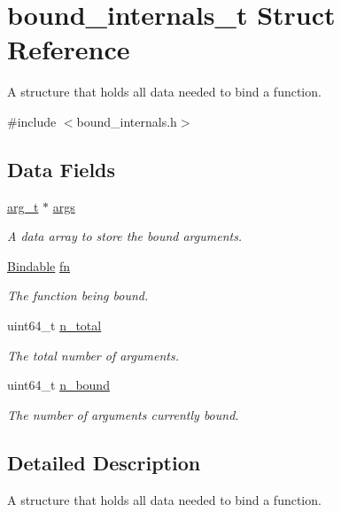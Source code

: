 \hypertarget{structbound__internals__t}{}\section{bound\+\_\+internals\+\_\+t Struct Reference}
\label{structbound__internals__t}


A structure that holds all data needed to bind a function.  




{\ttfamily \#include $<$bound\+\_\+internals.\+h$>$}

\subsection*{Data Fields}
\begin{DoxyCompactItemize}
\item 
\hyperlink{bind__defs_8h_aa409ee08129c587e002cf2062a09a744}{arg\+\_\+t} $\ast$ \hyperlink{structbound__internals__t_a84757175e6e08d7364e8aad728e49985}{args}
\begin{DoxyCompactList}\small\item\em A data array to store the bound arguments. \end{DoxyCompactList}\item 
\hyperlink{bind__defs_8h_a8fdbf6bcbe597219692d8bd8952b9839}{Bindable} \hyperlink{structbound__internals__t_ac9b29b4f9b69674cef9fb3d083b92521}{fn}
\begin{DoxyCompactList}\small\item\em The function being bound. \end{DoxyCompactList}\item 
uint64\+\_\+t \hyperlink{structbound__internals__t_a804e2e3c6b4c0ca1814c6884ed0bd161}{n\+\_\+total}
\begin{DoxyCompactList}\small\item\em The total number of arguments. \end{DoxyCompactList}\item 
uint64\+\_\+t \hyperlink{structbound__internals__t_aa959691320a507b149ff25164740a323}{n\+\_\+bound}
\begin{DoxyCompactList}\small\item\em The number of arguments currently bound. \end{DoxyCompactList}\end{DoxyCompactItemize}


\subsection{Detailed Description}
A structure that holds all data needed to bind a function. 

